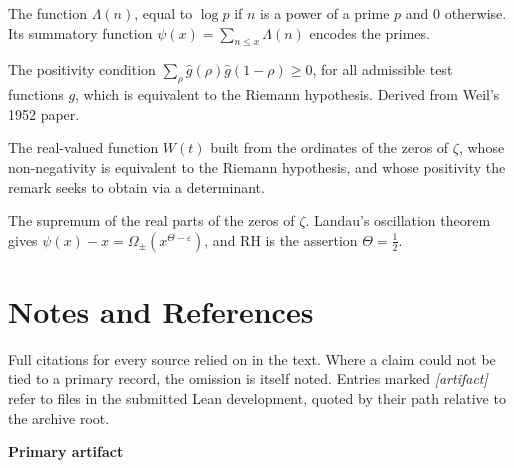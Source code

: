 \begin{description}[style=nextline,leftmargin=0pt,labelwidth=0pt,labelsep=0pt,font=\sffamily\bfseries\small,
  itemsep=5pt]
\item[von Mangoldt function] The function $\Lambda(n)$, equal to $\log p$ if
$n$ is a power of a prime $p$ and $0$ otherwise. Its summatory function
$\psi(x) = \sum_{n \le x}\Lambda(n)$ encodes the primes.

\item[Weil's criterion] The positivity condition
$\sum_\rho \hat g(\rho)\hat g(1-\rho) \ge 0$, for all admissible test
functions $g$, which is equivalent to the Riemann hypothesis. Derived from
Weil's 1952 paper.

\item[Weil expression] The real-valued function $W(t)$ built from the
ordinates of the zeros of $\zeta$, whose non-negativity is equivalent to the
Riemann hypothesis, and whose positivity the remark seeks to obtain via a
determinant.

\item[$\Theta$] The supremum of the real parts of the zeros of $\zeta$.
Landau's oscillation theorem gives $\psi(x) - x = \Omega_\pm(x^{\Theta-\varepsilon})$,
and RH is the assertion $\Theta = \tfrac12$.

\end{description}

\chapter*{Notes and References}
\thispagestyle{plain}

\noindent\small
Full citations for every source relied on in the text. Where a claim could
not be tied to a primary record, the omission is itself noted. Entries marked
\emph{[artifact]} refer to files in the submitted Lean development, quoted by
their path relative to the archive root.

\vspace{10pt}
{\sffamily\bfseries\small Primary artifact}

